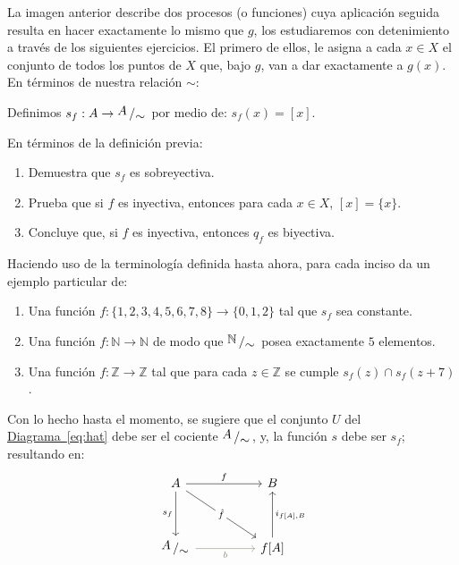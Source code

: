\documentclass[letterpaper,DIV=14,headsepline,12pt]{scrartcl}
\newcommand{\pts}{}
\newenvironment{ejercicio}[1]{\ifthenelse{\equal{#1}{1} \OR \equal{#1}{+1}}{\renewcommand{\pts}{\textbf{(#1 pt)}}}{\renewcommand{\pts}{\textbf{(#1 pts)}}}\begin{ejj}\upshape \pts}{\end{ejj}}
\newcommand{\quot}[2]{{\raisebox{.2em}{$#1$}\left/\raisebox{-.2em}{$#2$}\right.}}
\begin{document}
    La imagen anterior describe dos procesos (o funciones) cuya aplicación seguida resulta en hacer exactamente lo mismo que $g$, los estudiaremos con detenimiento a través de los siguientes ejercicios. El primero de ellos, le asigna a cada $x \in X$ el conjunto de todos los puntos de $X$ que, bajo $g$, van a dar exactamente a $g(x)$. En términos de nuestra relación $\sim$:

    \begin{definicion}
        Definimos $s_f:A \to \quot{A}{\sim}$ por medio de: $s_f(x)=[x]$.
    \end{definicion}

    \begin{ejercicio}{1.5}
        En términos de la definición previa:
        \begin{enumerate}
            \item Demuestra que $s_f$ es sobreyectiva.
            \item Prueba que si $f$ es inyectiva, entonces para cada $x \in X$, $[x]=\{x\}$.
            \item Concluye que, si $f$ es inyectiva, entonces $q_f$ es biyectiva.
        \end{enumerate}
    \end{ejercicio}

    \begin{ejercicio}{1.5}
        Haciendo uso de la terminología definida hasta ahora, para cada inciso da un ejemplo particular de:
        \begin{enumerate}
            \item Una función $f:\{1,2,3,4,5,6,7,8\} \to \{0,1,2\}$ tal que $s_f$ sea constante.
            \item Una función $f:\mathbb{N} \to \mathbb{N}$ de modo que $\quot{\mathbb{N}}{\sim}$ posea exactamente $5$ elementos.
            \item Una función $f:\mathbb{Z} \to \mathbb{Z}$ tal que para cada $z \in \mathbb{Z}$ se cumple $s_f(z) \cap s_f(z+7)$.
        \end{enumerate}
    \end{ejercicio}

    Con lo hecho hasta el momento, se sugiere que el conjunto $U$ del \hyperref[eq:hat]{Diagrama~\ref*{eq:hat}} debe ser el cociente $\quot{A}{\sim}$, y, la función $s$ debe ser $s_f$; resultando en:
    \begin{equation}\label{eq:casi}
        \begin{tikzcd}
            A && B \\
            \\
            \quot{A}{\sim} && {f[A]}
            \arrow["f", from=1-1, to=1-3]
            \arrow["s_f"', from=1-1, to=3-1]
            \arrow["{\hat{f}}"{description}, from=1-1, to=3-3]
            \arrow["b"', from=3-1, to=3-3, draw=Cornsilk4, text=Cornsilk4]
            \arrow["{i_{f[A],B}}"', from=3-3, to=1-3]
        \end{tikzcd}
    \end{equation}
\end{document}
